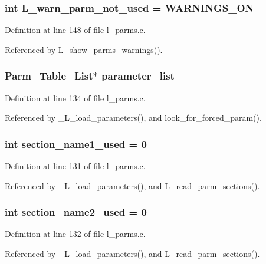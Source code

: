 \subsubsection{\setlength{\rightskip}{0pt plus 5cm}int \bf{L\_\-warn\_\-parm\_\-not\_\-used} = WARNINGS\_\-ON}\label{l__parms_8c_6e2370b0d062442e4748c92dbfe6260b}




Definition at line 148 of file l\_\-parms.c.

Referenced by L\_\-show\_\-parms\_\-warnings().
\subsubsection{\setlength{\rightskip}{0pt plus 5cm}\bf{Parm\_\-Table\_\-List}$\ast$ \bf{parameter\_\-list}}\label{l__parms_8c_bea3a267ff4c64fa5666dc5d59c6384a}




Definition at line 134 of file l\_\-parms.c.

Referenced by \_\-L\_\-load\_\-parameters(), and look\_\-for\_\-forced\_\-param().
\subsubsection{\setlength{\rightskip}{0pt plus 5cm}int \bf{section\_\-name1\_\-used} = 0}\label{l__parms_8c_b3618a90780bdfe2c9d4bb6609c3c654}




Definition at line 131 of file l\_\-parms.c.

Referenced by \_\-L\_\-load\_\-parameters(), and L\_\-read\_\-parm\_\-sections().
\subsubsection{\setlength{\rightskip}{0pt plus 5cm}int \bf{section\_\-name2\_\-used} = 0}\label{l__parms_8c_eb7d3d952cc4201c1cdee122eee1958c}




Definition at line 132 of file l\_\-parms.c.

Referenced by \_\-L\_\-load\_\-parameters(), and L\_\-read\_\-parm\_\-sections().
